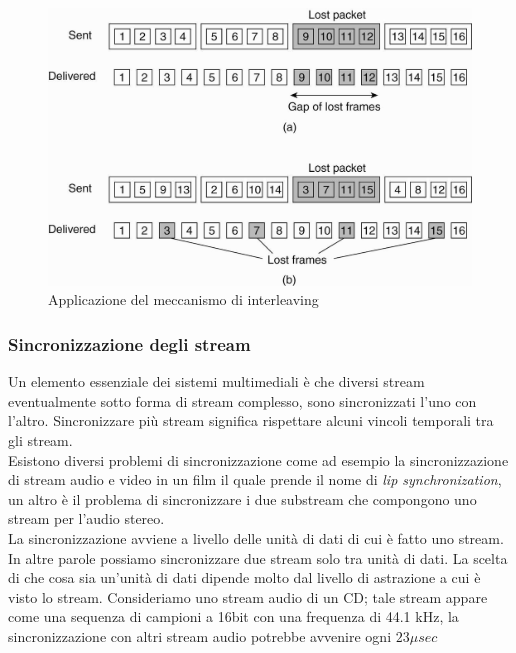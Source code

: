 \begin{figure}
\centering
\includegraphics[scale=0.3]{img/interleaving.png}
\caption{Applicazione del meccanismo di interleaving}\label{img:interleaving}
\end{figure}
\subsubsection{Sincronizzazione degli stream}
Un elemento essenziale dei sistemi multimediali è che diversi stream eventualmente sotto forma di stream complesso, sono sincronizzati l'uno con l'altro. Sincronizzare più stream significa rispettare alcuni vincoli temporali tra gli stream.\\
Esistono diversi problemi di sincronizzazione come ad esempio la sincronizzazione di stream audio e video in un film il quale prende il nome di \emph{lip synchronization}, un altro è il problema di sincronizzare i due substream che compongono uno stream per l'audio stereo.\\
La sincronizzazione avviene a livello delle unità di dati di cui è fatto uno stream. In altre parole possiamo sincronizzare due stream solo tra unità di dati. La scelta di che cosa sia un'unità di dati dipende molto dal livello di astrazione a cui è visto lo stream.
Consideriamo uno stream audio di un CD; tale stream appare come una sequenza di campioni a 16bit con una frequenza di 44.1 kHz, la sincronizzazione con altri stream audio potrebbe avvenire ogni $23\mu sec$
